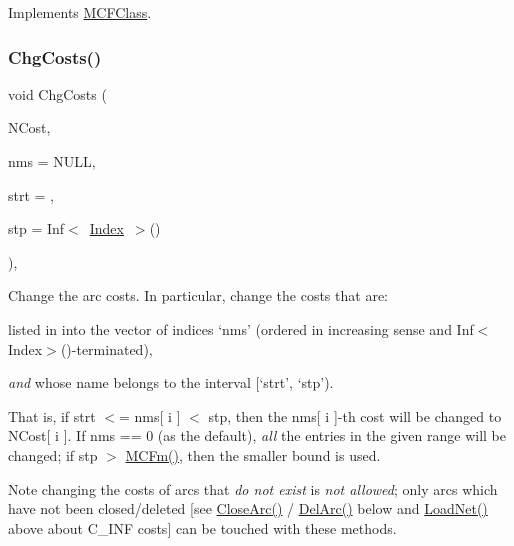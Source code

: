 Implements \mbox{\hyperlink{class_m_c_f_class_a41ab6d76a454b3f792665cce35a250f3}{M\+C\+F\+Class}}.

\mbox{\label{class_m_c_f_simplex_a1f8f2db739c0307ee7f4383972821e12}} 
\subsubsection{\texorpdfstring{Chg\+Costs()}{ChgCosts()}}
{\footnotesize\ttfamily void Chg\+Costs (\begin{DoxyParamCaption}\item[{\mbox{\hyperlink{class_m_c_f_class_ab700102e9ba8bb6015be6818d4e99097}{c\+C\+Row}}}]{N\+Cost,  }\item[{\mbox{\hyperlink{class_m_c_f_class_a81575b2d4e4d5636b17170432150ae69}{c\+Index\+\_\+\+Set}}}]{nms = {\ttfamily NULL},  }\item[{\mbox{\hyperlink{class_m_c_f_class_a76aaabb20535c51a2752b93f6c38fe54}{c\+Index}}}]{strt = {},  }\item[{\mbox{\hyperlink{class_m_c_f_class_ad53d6229d7ec28555a9c9c2fd9abf773}{Index}}}]{stp = {\ttfamily Inf$<$~\mbox{\hyperlink{class_m_c_f_class_ad53d6229d7ec28555a9c9c2fd9abf773}{Index}}~$>$()} }\end{DoxyParamCaption})\hspace{0.3cm}{\ttfamily [override]}, {\ttfamily [virtual]}}

Change the arc costs. In particular, change the costs that are\+:


\begin{DoxyItemize}
\item listed in into the vector of indices `nms' (ordered in increasing sense and Inf$<$\+Index$>$()-\/terminated),
\item {\itshape and} whose name belongs to the interval \mbox{[}`strt', `stp').
\end{DoxyItemize}

That is, if strt $<$= nms\mbox{[} i \mbox{]} $<$ stp, then the nms\mbox{[} i \mbox{]}-\/th cost will be changed to N\+Cost\mbox{[} i \mbox{]}. If nms == 0 (as the default), {\itshape all} the entries in the given range will be changed; if stp $>$ \mbox{\hyperlink{class_m_c_f_class_ab4d5a0d0fc49882de0b4eb3146f1b7a6}{M\+C\+Fm()}}, then the smaller bound is used.

\begin{DoxyNote}{Note}
changing the costs of arcs that {\itshape do not exist} is {\itshape not allowed}; only arcs which have not been closed/deleted \mbox{[}see \mbox{\hyperlink{class_m_c_f_simplex_a4a964ce79159307998f5acd0018d01b1}{Close\+Arc()}} / \mbox{\hyperlink{class_m_c_f_simplex_a3b6145c95b83f40a76d724eb2b92f80f}{Del\+Arc()}} below and \mbox{\hyperlink{class_m_c_f_simplex_ac270d18d58fd6fe88164cde1f4c80aff}{Load\+Net()}} above about C\+\_\+\+I\+NF costs\mbox{]} can be touched with these methods. 
\end{DoxyNote}


